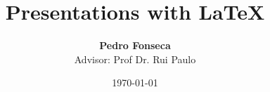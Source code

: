


\title[Presentations with Latex]{Presentations with \LaTeX}
\author[Pedro Fonseca]{\textbf {Pedro Fonseca} \\ \footnotesize Advisor: Prof Dr. Rui Paulo}
\date{\today}


























